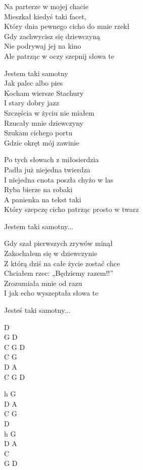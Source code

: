 \begin{text}
    Na parterze w mojej chacie\\
    Mieszkał kiedyś taki facet,\\
    Który dnia pewnego cicho do mnie rzekł\\
    Gdy zachwycisz się dziewczyną\\
    Nie podrywaj jej na kino\\
    Ale patrząc w oczy szepnij słowa te

    \vin Jestem taki samotny\\
    \vin Jak palec albo pies\\
    \vin Kocham wiersze Stachury\\
    \vin I stary dobry jazz\\
    \vin Szczęścia w życiu nie miałem\\
    \vin Rzucały mnie dziewczyny\\
    \vin Szukam cichego portu\\
    \vin Gdzie okręt mój zawinie

    Po tych słowach z miłosierdzia\\
    Padła już niejedna twierdza\\
    I niejedna cnota poszła chyżo w las\\
    Ryba bierze na robaki\\
    A panienka na tekst taki\\
    Który szepczę cicho patrząc prosto w twarz

    \vin Jestem taki samotny...

    Gdy szał pierwszych zrywów minął\\
    Zakochałem się w dziewczynie\\
    Z którą dziś na całe życie zostać chce\\
    Chciałem rzec: „Będziemy razem!!”\\
    Zrozumiała mnie od razu\\
    I jak echo wyszeptała słowa te

    \vin Jesteś taki samotny...
\end{text}
\begin{chord}
    D\\
    G D\\
    C G D\\
    C G\\
    D A\\
    C G D

    h G\\
    D A\\
    C G\\
    D\\
    h G\\
    D A\\
    C\\
    G D
\end{chord}